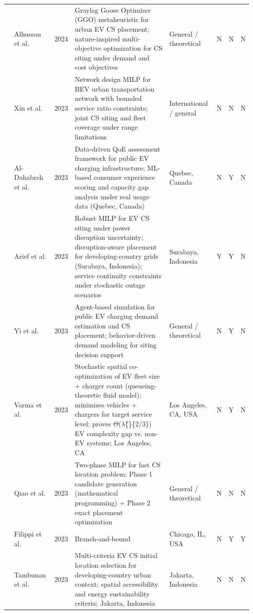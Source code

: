 \documentclass[letterpaper, 12pt, oneside, doublespacing]{Thesis}
\begin{document}
\begin{longtable}{L{0.9cm} L{1.8cm} L{0.7cm} L{2.5cm} L{2.1cm} L{0.7cm} L{0.7cm} L{0.7cm}}
\cite{urban_electric_2024} & Alhussan et al. & 2024 & Graylag Goose Optimizer (GGO) metaheuristic for urban EV CS placement; nature-inspired multi-objective optimization for CS siting under demand and cost objectives & General {\slash} theoretical & N & N & N \\
\cite{a_battery_2023} & Xin et al. & 2023 & Network design MILP for BEV urban transportation network with bounded service ratio constraints; joint CS siting and fleet coverage under range limitations & International {\slash} general & N & N & N \\
\cite{a_data-driven_2023} & Al-Dahabreh et al. & 2023 & Data-driven QoE assessment framework for public EV charging infrastructure; ML-based consumer experience scoring and capacity gap analysis under real usage data (Quebec, Canada) & Quebec, Canada & N & Y & N \\
\cite{a_robust_2023} & Arief et al. & 2023 & Robust MILP for EV CS siting under power disruption uncertainty; disruption-aware placement for developing-country grids (Surabaya, Indonesia); service continuity constraints under stochastic outage scenarios & Surabaya, Indonesia & Y & Y & N \\
\cite{an_agent-based_2023} & Yi et al. & 2023 & Agent-based simulation for public EV charging demand estimation and CS placement; behavior-driven demand modeling for siting decision support & General {\slash} theoretical & N & Y & N \\
\cite{electric_vehicle_2023} & Varma et al. & 2023 & Stochastic spatial co-optimization of EV fleet size + charger count (queueing-theoretic fluid model); minimizes vehicles + chargers for target service level; proves $\Theta$($\lambda$\^\{\}\{2/3\}) EV complexity gap vs. non-EV systems; Los Angeles, CA & Los Angeles, CA, USA & N & Y & N \\
\cite{fast-charging_station_2023} & Qiao et al. & 2023 & Two-phase MILP for fast CS location problem: Phase 1 candidate generation (mathematical programming) + Phase 2 exact placement optimization & General {\slash} theoretical & N & N & N \\
\cite{incorporating_time-dependent_2023} & Filippi et al. & 2023 & Branch-and-bound & Chicago, IL, USA & N & Y & Y \\
\cite{initial_location_2023} & Tambunan et al. & 2023 & Multi-criteria EV CS initial location selection for developing-country urban context; spatial accessibility and energy sustainability criteria; Jakarta, Indonesia & Jakarta, Indonesia & N & N & N \\

\end{longtable}
\end{document}
